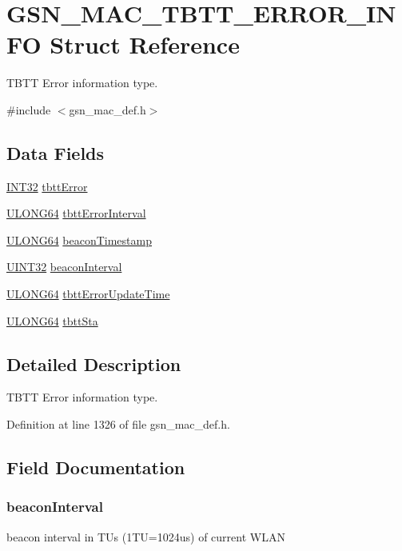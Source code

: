 \hypertarget{a00134}{
\section{GSN\_\-MAC\_\-TBTT\_\-ERROR\_\-INFO Struct Reference}
\label{a00134}
}


TBTT Error information type.  




{\ttfamily \#include $<$gsn\_\-mac\_\-def.h$>$}

\subsection*{Data Fields}
\begin{DoxyCompactItemize}
\item 
\hyperlink{a00660_ga63021d67d54286c2163bcdb43a6f2569}{INT32} \hyperlink{a00134_a3d1414bdcc8e606c7ce01b0ae1ecd3f5}{tbttError}
\item 
\hyperlink{a00660_ga28961430434ccabca6862ea93fe9a15b}{ULONG64} \hyperlink{a00134_a6ee6d5e38a858420f2c05255880cd74b}{tbttErrorInterval}
\item 
\hyperlink{a00660_ga28961430434ccabca6862ea93fe9a15b}{ULONG64} \hyperlink{a00134_a9363de710e6e10227bd2cba50db103f1}{beaconTimestamp}
\item 
\hyperlink{a00660_gae1e6edbbc26d6fbc71a90190d0266018}{UINT32} \hyperlink{a00134_a500e8dd044fc9ab3a3667118412b098a}{beaconInterval}
\item 
\hyperlink{a00660_ga28961430434ccabca6862ea93fe9a15b}{ULONG64} \hyperlink{a00134_a179f80a8972ebcf158d1107182fd1ca3}{tbttErrorUpdateTime}
\item 
\hyperlink{a00660_ga28961430434ccabca6862ea93fe9a15b}{ULONG64} \hyperlink{a00134_a50a8d50f9a6fb53e3f5aa9d2dd67606a}{tbttSta}
\end{DoxyCompactItemize}


\subsection{Detailed Description}
TBTT Error information type. 

Definition at line 1326 of file gsn\_\-mac\_\-def.h.



\subsection{Field Documentation}
\hypertarget{a00134_a500e8dd044fc9ab3a3667118412b098a}{
\subsubsection[{beaconInterval}]{ {\bf beaconInterval}}}
\label{a00134_a500e8dd044fc9ab3a3667118412b098a}
beacon interval in TUs (1TU=1024us) of current WLAN 

